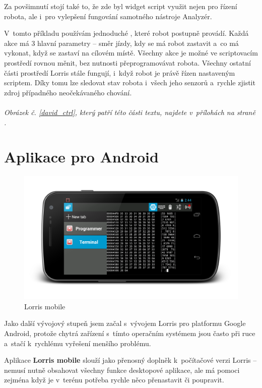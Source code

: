 \documentclass[12pt, a4paper, oneside]{article}
\newcommand{\It}{\textit}  %
\begin{document}
Za povšimnutí stojí také to, že zde byl widget script využit nejen pro řízení robota, ale i~pro vylepšení fungování samotného nástroje Analyzér.

V~tomto příkladu používám jednoduché , které robot postupně provádí. Každá akce má 3 hlavní parametry -- směr jízdy, kdy se má robot zastavit a~co má vykonat, když se zastaví na cílovém místě. Všechny akce je možné ve scriptovacím prostředí rovnou měnit, bez nutnosti přeprogramovávat robota. Všechny ostatní části prostředí Lorris stále fungují, i~když robot je právě řízen nastaveným scriptem. Díky tomu lze sledovat stav robota i~všech jeho senzorů a~rychle zjistit zdroj případného neočekávaného chování.
\\
\\
\noindent\It{Obrázek č. \ref{david_ctrl}, který patří této části textu, najdete v~přílohách na straně \pageref{david_ctrl}.}

\newpage
\section{Aplikace pro Android}
\begin{figure}[H]
\begin{center}
\includegraphics[width=\textwidth]{img/mobile.png}
\caption{Lorris mobile}
\end{center}
\end{figure}
Jako další vývojový stupeň jsem začal s~vývojem Lorris pro platformu Google Android\cite{android}, protože chytrá zařízení s~tímto operačním systémem jsou často při ruce a~stačí k~rychlému vyřešení menšího problému.

Aplikace {\bf Lorris mobile} slouží jako přenosný doplněk k~počítačové verzi Lorris -- nemusí nutně obsahovat všechny funkce desktopové aplikace, ale má pomoci zejména když je v~terénu potřeba rychle něco přenastavit či poupravit.
\end{document}
